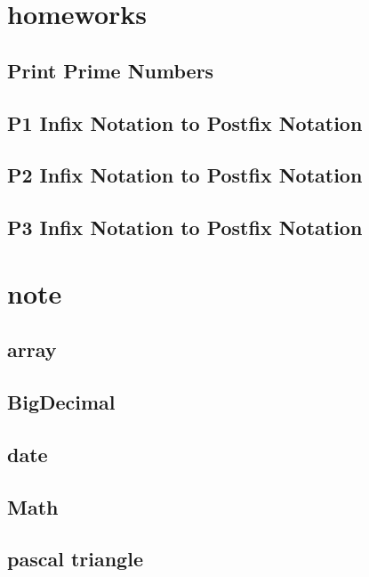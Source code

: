 \section{homeworks}
    \subsection{Print Prime Numbers}
            
    \subsection{P1 Infix Notation to Postfix Notation}
             
    \subsection{P2 Infix Notation to Postfix Notation}
        
    \subsection{P3 Infix Notation to Postfix Notation}
        

\section{note}
    \subsection{array}
            
    \subsection{BigDecimal}
             
    \subsection{date}
        
    \subsection{Math}
        
    \subsection{pascal triangle}
            
